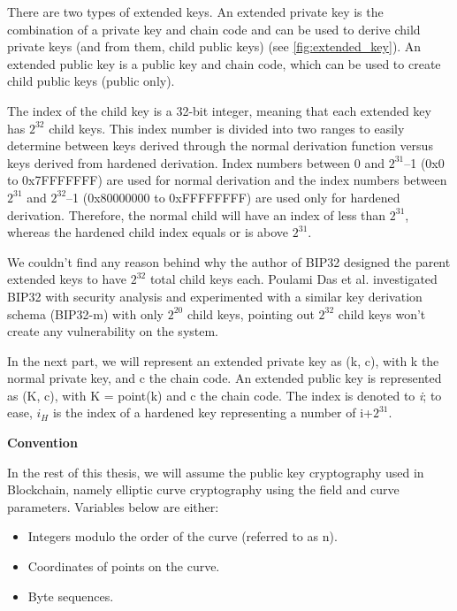 There are two types of extended keys. An extended private key is the combination of a private key and chain code and can be used to derive child private keys (and from them, child public keys) (see \autoref{fig:extended_key}). An extended public key is a public key and chain code, which can be used to create child public keys (public only). 

The index of the child key is a 32-bit integer, meaning that each extended key has $2^{32}$ child keys. This index number is divided into two ranges to easily determine between keys derived through the normal derivation function versus keys derived from hardened derivation. Index numbers between 0 and $2^{31}$–1 (0x0 to 0x7FFFFFFF) are used for normal derivation and the index numbers between $2^{31}$ and $2^{32}$–1 (0x80000000 to 0xFFFFFFFF) are used only for hardened derivation. Therefore, the normal child will have an index of less than $2^{31}$, whereas the hardened child index equals or is above  $2^{31}$.

We couldn’t find any reason behind why the author of BIP32 designed the parent extended keys to have $2^{32}$ total child keys each. Poulami Das et al. \cite{DBLP:conf/ccs/0003EFL021} investigated BIP32 with security analysis and experimented with a similar key derivation schema (BIP32-m) with only $2^{20}$ child keys, pointing out $2^{32}$ child keys won’t create any vulnerability on the system.

In the next part, we will represent an extended private key as (k, c), with k the normal private key, and c the chain code. An extended public key is represented as (K, c), with K = point(k) and c the chain code. The index is denoted to \textit{i}; to ease, $i_H$ is the index of a hardened key representing a number of i+$2^{31}$.

\bigskip
{\textbf{Convention}}

In the rest of this thesis, we will assume the public key cryptography used in Blockchain, namely elliptic curve cryptography using the field and curve parameters. Variables below are either:

\begin{itemize}
  \item Integers modulo the order of the curve (referred to as n).

  \item Coordinates of points on the curve.

  \item Byte sequences.
\end{itemize}

